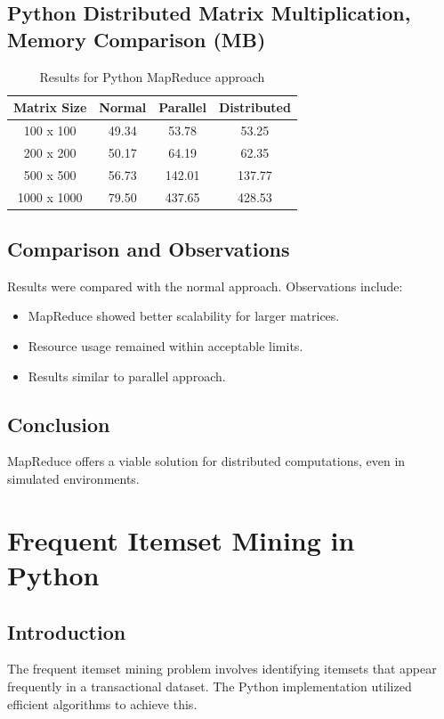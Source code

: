 \documentclass{article}
\begin{document}
\subsection{Python Distributed Matrix Multiplication, Memory Comparison (MB)}
\begin{table}[H]
    \centering
    \begin{tabular}{|c|c|c|c|}
    \hline
    Matrix Size & Normal & Parallel & Distributed \\
    \hline
    100 x 100 & 49.34 & 53.78 & 53.25 \\
    200 x 200 & 50.17 & 64.19 & 62.35 \\
    500 x 500 & 56.73 & 142.01 & 137.77 \\
    1000 x 1000 & 79.50 & 437.65 & 428.53 \\
    \hline
    \end{tabular}
    \caption{Results for Python MapReduce approach}
\end{table}

\subsection{Comparison and Observations}
Results were compared with the normal approach. Observations include:
\begin{itemize}
    \item MapReduce showed better scalability for larger matrices.
    \item Resource usage remained within acceptable limits.
    \item Results similar to parallel approach.
\end{itemize}

\subsection{Conclusion}
MapReduce offers a viable solution for distributed computations, even in simulated environments.

\section{Frequent Itemset Mining in Python}

\subsection{Introduction}
The frequent itemset mining problem involves identifying itemsets that appear frequently in a transactional dataset. The Python implementation utilized efficient algorithms to achieve this.
\end{document}
